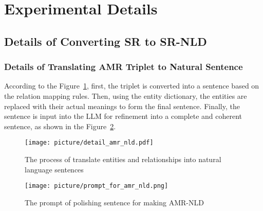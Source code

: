 \clearpage

\appendix
\section{Experimental Details}
\subsection{Details of Converting SR to SR-NLD}
\label{app:Detail_sr2nld}
\subsubsection{Details of Translating AMR Triplet to Natural Sentence} 

According to the Figure~\ref{fig:detail_amr_nld}, first, the triplet is converted into a sentence based on the relation mapping rules. Then, using the entity dictionary, the entities are replaced with their actual meanings to form the final sentence. Finally, the sentence is input into the LLM for refinement into a complete and coherent sentence, as shown in the Figure~\ref{fig:amrnld_prompt}.


\begin{figure}[ht]
\centering
\vspace{0in}
\texttt{[image: picture/detail\_amr\_nld.pdf]}
\caption{The process of translate entities and relationships into natural language sentences}
\label{fig:detail_amr_nld}
\vspace{-0.1in}
\end{figure}

\begin{figure}[ht]
\centering
\vspace{0in}
\texttt{[image: picture/prompt\_for\_amr\_nld.png]}
\caption{The prompt of polishing sentence for making AMR-NLD}
\label{fig:amrnld_prompt}
\vspace{-0.1in}
\end{figure}

